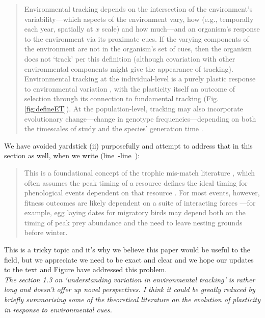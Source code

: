 \documentclass[11pt]{article}
\newcommand{\lr}[1]{line~\lineref{#1}}
\begin{document}
\begin{quote}
Environmental tracking depends on the intersection of the environment's variability---which aspects of the environment vary, how (e.g., temporally each year, spatially at $x$ scale) and how much---and an organism's response to the environment via its proximate cues. If the varying components of the environment are not in the organism's set of cues, then the organism does not `track' per this definition (although covariation with other environmental components might give the appearance of tracking). Environmental tracking at the individual-level is a purely plastic response to environmental variation \citep[in line with current findings on most climate change responses,][]{bonamour2019}, with the plasticity itself an outcome of selection \citep{chevin2010} through its connection to fundamental tracking (Fig. \ref{fig:defineET}). At the population-level, tracking may also incorporate evolutionary change---change in genotype frequencies---depending on both the timescales of study and the species' generation time \citep[this evolutionary response can be predicted as the difference between the environmental sensitivity of phenotypic selection and an organism's plasticity, $|B-b|$ in][]{chevin2010}.
\end{quote}
We have avoided yardstick (ii) purposefully and attempt to address that in this section as well, when we write (\lr{r4yardstickS}-\lr{r4yardstickE}):
\begin{quote}
This is a foundational concept of the trophic mis-match literature \citep{vissergienapp2019}, which often assumes the peak timing of a resource defines the ideal timing for phenological events dependent on that resource \citep[e.g. egg laying dates dependent on caterpillar abundance,][]{Visser:2005bg}. For most events, however, fitness outcomes are likely dependent on a suite of interacting forces \citep[e.g.,][]{reed2013}---for example, egg laying dates for migratory birds may depend both on the timing of peak prey abundance and the need to leave nesting grounds before winter.
\end{quote}
This is a tricky topic and it's why we believe this paper would be useful to the field, but we appreciate we need to be exact and clear and we hope our updates to the text and Figure have addressed this problem.\\

\emph{The section 1.3 on `understanding variation in environmental tracking' is rather long and
doesn't offer up novel perspectives. I think it could be greatly reduced by briefly
summarising some of the theoretical literature on the evolution of plasticity in response to
environmental cues.}\\
\end{document}
